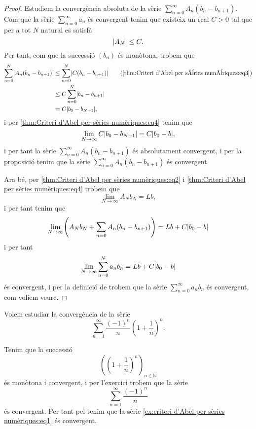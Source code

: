 \documentclass[../Apunts.tex]{subfiles}
\begin{document}
\begin{theorem}
\begin{proof}
			Estudiem la convergència absoluta de la sèrie \(\sum_{n=0}^{\infty}A_{n}(b_{n}-b_{n+1})\). Com que la sèrie \(\sum_{n=0}^{\infty}a_{n}\) és convergent tenim que existeix un real \(C>0\) tal que per a tot \(N\) natural es satisfà
			\begin{equation}
				\label{thm:Criteri d'Abel per sèries numèriques:eq3}
				\abs{A_{N}}\leq C.
			\end{equation}
			Per tant, com que la successió \((b_{n})\) és monòtona, trobem que
			\begin{align*}
				\sum_{n=0}^{N}\abs{A_{n}(b_{n}-b_{n+1})}&\leq\sum_{n=0}^{N}\abs{C(b_{n}-b_{n+1})} \tag{\ref{thm:Criteri d'Abel per sèries numèriques:eq3}}\\
				&\leq C\sum_{n=0}^{N}\abs{b_{n}-b_{n+1}} \\
				&=C\abs{b_{0}-b_{N+1}},
			\end{align*}
			i per \eqref{thm:Criteri d'Abel per sèries numèriques:eq4} tenim que
			\[\lim_{N\to\infty}C\abs{b_{0}-b_{N+1}}=C\abs{b_{0}-b},\]
			i per tant la sèrie \(\sum_{n=0}^{\infty}A_{n}(b_{n}-b_{n+1})\) és absolutament convergent, %
			i per la proposició  tenim que la sèrie \(\sum_{n=0}^{\infty}A_{n}(b_{n}-b_{n+1})\) és convergent.
			
			Ara bé, per \eqref{thm:Criteri d'Abel per sèries numèriques:eq2} i \eqref{thm:Criteri d'Abel per sèries numèriques:eq4} trobem que
			\[\lim_{N\to\infty}A_{N}b_{N}=Lb,\]
			i per tant tenim que
			\[\lim_{N\to\infty}\left(A_{N}b_{N}+\sum_{n=0}A_{n}(b_{n}-b_{n+1})\right)=Lb+C\abs{b_{0}-b}\]
			i per tant
			\[\lim_{N\to\infty}\sum_{n=0}^{N}a_{n}b_{n}=Lb+C\abs{b_{0}-b}\]
			és convergent, i per la definició de  trobem que la sèrie \(\sum_{n=0}^{\infty}a_{n}b_{n}\) és convergent, com volíem veure.
		\end{proof}
	\end{theorem}
	\begin{example}
		\label{ex:criteri d'Abel per sèries numèriques}
		Volem estudiar la convergència de la sèrie
		\begin{equation}
			\label{ex:criteri d'Abel per sèries numèriques:eq1}
			\sum_{n=1}^{\infty}\frac{(-1)^{n}}{n}\left(1+\frac{1}{n}\right)^{n}.
		\end{equation}
		\begin{solution}
			Tenim que la successió %
			\[\left(\left(1+\frac{1}{n}\right)^{n}\right)_{n\in\mathbb{N}}\]
			és monòtona i convergent, i per l'exercici  trobem que la sèrie
			\[\sum_{n=1}^{\infty}\frac{(-1)^{n}}{n}\]
			és convergent. Per tant pel  tenim que la sèrie \eqref{ex:criteri d'Abel per sèries numèriques:eq1} és convergent.
		\end{solution}
	\end{example}	
\end{document}
